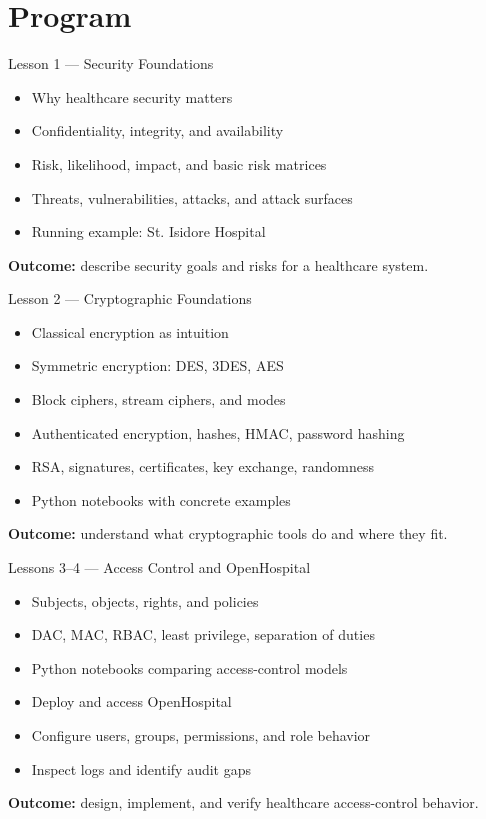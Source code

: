 \documentclass[presentation]{beamer}
\begin{document}
\section{Program}

\begin{frame}[c]{Lesson 1 --- Security Foundations}
\begin{itemize}
    \item Why healthcare security matters
    \item Confidentiality, integrity, and availability
    \item Risk, likelihood, impact, and basic risk matrices
    \item Threats, vulnerabilities, attacks, and attack surfaces
    \item Running example: St. Isidore Hospital
\end{itemize}
\bigskip
\textbf{Outcome:} describe security goals and risks for a healthcare system.
\end{frame}

\begin{frame}[c]{Lesson 2 --- Cryptographic Foundations}
\begin{itemize}
    \item Classical encryption as intuition
    \item Symmetric encryption: DES, 3DES, AES
    \item Block ciphers, stream ciphers, and modes
    \item Authenticated encryption, hashes, HMAC, password hashing
    \item RSA, signatures, certificates, key exchange, randomness
    \item Python notebooks with concrete examples
\end{itemize}
\bigskip
\textbf{Outcome:} understand what cryptographic tools do and where they fit.
\end{frame}

\begin{frame}[c]{Lessons 3--4 --- Access Control and OpenHospital}
\begin{itemize}
    \item Subjects, objects, rights, and policies
    \item DAC, MAC, RBAC, least privilege, separation of duties
    \item Python notebooks comparing access-control models
    \item Deploy and access OpenHospital
    \item Configure users, groups, permissions, and role behavior
    \item Inspect logs and identify audit gaps
\end{itemize}
\bigskip
\textbf{Outcome:} design, implement, and verify healthcare access-control behavior.
\end{frame}
\end{document}
